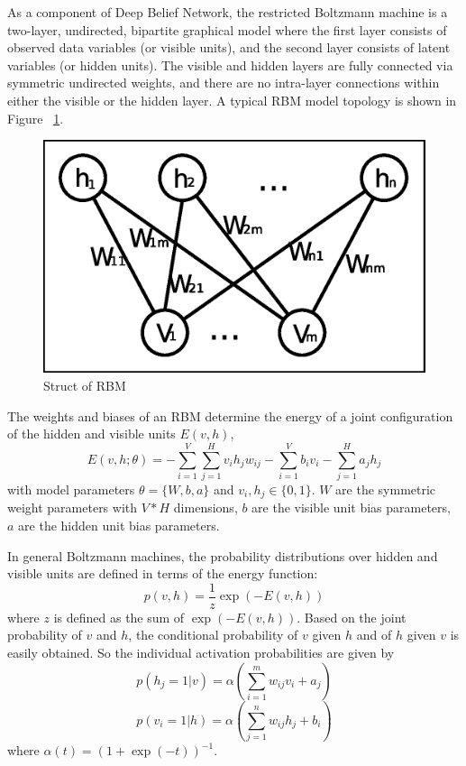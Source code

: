 \documentclass[10pt,twocolumn,letterpaper]{article}
\begin{document}
As a component of Deep Belief Network, the restricted Boltzmann machine \cite{13} is a two-layer, undirected, bipartite graphical model where the first layer consists of observed data variables (or visible units), and the second layer consists of latent variables (or hidden units). The visible and hidden layers are fully connected via symmetric undirected weights, and there are no intra-layer connections within either the visible or the hidden layer. A typical RBM model topology is shown in Figure ~\ref{fig:RBN}.
\begin{figure}[ht]
\begin{center}
   \includegraphics[width=0.8\linewidth]{RBN.eps}
\end{center}
   \caption{Struct of RBM}
\label{fig:RBN}
\end{figure}

The weights and biases of an RBM determine the energy of
a joint configuration of the hidden and visible units $E(v,h)$,
\begin{equation}
E(v,h;\theta) = -\sum_{i=1}^V \sum_{j=1}^H v_ih_jw_{ij} - \sum_{i=1}^V b_iv_i - \sum_{j=1}^H a_jh_j
\end{equation}
with model parameters $\theta = \{W,b,a\}$ and $v_i,h_j \in \{0,1\}$. $W$ are the symmetric weight parameters with $V * H$ dimensions, $b$ are the visible unit bias parameters, $a$ are the hidden unit bias parameters.

In general Boltzmann machines, the probability distributions
over hidden and visible units are defined in terms of the energy function:
\begin{equation}
p(v,h) = \frac{1}{z} \exp ( -E(v,h) )
\end{equation}
where $z$ is defined as the sum of $\exp ( -E(v,h) )$. Based on the joint probability of $v$ and $h$, the conditional probability of $v$ given $h$ and of $h$ given $v$ is easily obtained. So the individual activation probabilities are given by
\begin{equation}
p(h_j = 1 | v) = \alpha(\sum_{i=1}^m w_{ij}v_i + a_j) 
\end{equation}
\begin{equation}
p(v_i = 1 | h) = \alpha(\sum_{j=1}^n w_{ij}h_j + b_i) 
\end{equation}
where $\alpha(t) = (1 + \exp(-t))^{-1}$.
\end{document}
